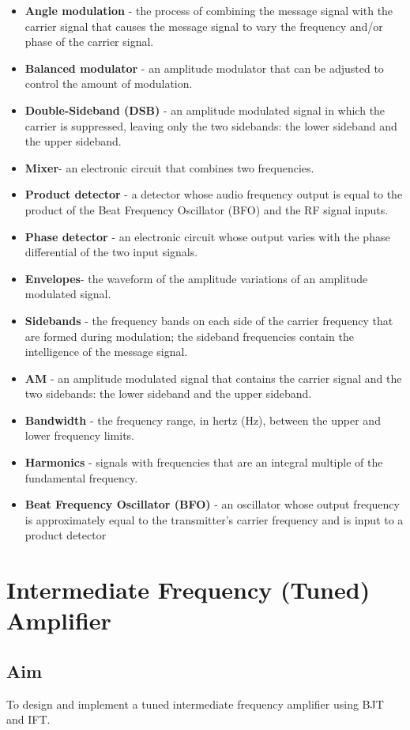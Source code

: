 \documentclass{book}
\begin{document}
\begin{itemize}
\item \textbf{Angle modulation} - the process of combining the message signal with the carrier signal that causes the message signal to vary the frequency and/or phase of the
carrier signal.
\item \textbf{Balanced modulator} - an amplitude modulator that can be adjusted to control the
amount of modulation.
\item \textbf{Double-Sideband (DSB)} - an amplitude modulated signal in which the carrier is
suppressed, leaving only the two sidebands: the lower sideband and the upper
sideband.
\item \textbf{Mixer}- an electronic circuit that combines two frequencies.
\item \textbf{Product detector} - a detector whose audio frequency output is equal to the product of the
Beat
Frequency Oscillator (BFO) and the RF signal inputs.
\item \textbf{Phase detector} - an electronic circuit whose output varies with the phase differential
of the two input signals.
\item \textbf{Envelopes}- the waveform of the amplitude variations of an amplitude modulated
signal. 
\item \textbf{Sidebands} - the frequency bands on each side of the carrier frequency that
are formed during modulation; the sideband frequencies contain the intelligence of
the message signal.
\item \textbf{AM} - an amplitude modulated signal that contains the carrier signal and the two
sidebands: the lower sideband and the upper sideband.
\item \textbf{Bandwidth} - the frequency range, in hertz (Hz), between the upper and lower
frequency limits. 
\item \textbf{Harmonics} - signals with frequencies that are an integral multiple of
the fundamental frequency. 
\item \textbf{Beat Frequency Oscillator (BFO)} - an oscillator whose
output frequency is approximately equal to the transmitter's carrier frequency and is
input to a product detector
\end {itemize}
\chapter[Intermediate Frequency Amplifier]{Intermediate Frequency (Tuned) Amplifier}
\section*{Aim}
To design and implement a tuned  intermediate frequency amplifier using BJT and IFT.
\end{document}

